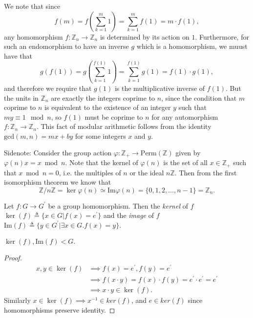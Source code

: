 \begin{Answer}
We note that since
$$
f(m) = f\left(\sum_{k=1}^m 1\right) = \sum_{k=1}^m f(1) = m \cdot f(1),
$$
any homomorphism $f : \mathbb{Z}_n \to \mathbb{Z}_n$ is determined by
its action on $1$. Furthermore, for such an endomorphism to have an
inverse $g$ which is a homomorphism, we muust have that
$$
g(f(1)) = g\left(\sum_{k=1}^{f(1)} 1\right)
        = \sum_{k=1}^{f(1)} g(1)
        = f(1) \cdot g(1),
$$
and therefore we require that $g(1)$ is the multiplicative inverse of
$f(1)$. But the units in $\mathbb{Z}_n$ are exactly the integers
coprime to $n$, since the condition that $m$ coprime to $n$ is
equivalent to the existence of an integer $y$ such that $my \equiv 1
\mod n$,
so $f(1)$ must be coprime to $n$ for any automorphism
$f : \mathbb{Z}_n \to \mathbb{Z}_n$. This fact of modular arithmetic
follows from the identity $\mathrm{gcd}(m, n) = mx + by$ for some
integers $x$ and $y$.

Sidenote: Consider the group action
$\varphi : \mathbb{Z}_+ \to \mathrm{Perm}(\mathbb{Z})$ given by
$\varphi(n) x = x \bmod n$. Note that the kernel of $\varphi(n)$
is the set of all $x \in \mathbb{Z}_+$ such that $x \bmod n = 0$,
i.e. the multiples of $n$ or the ideal $n \mathbb{Z}$. Then from the
first isomorphism theorem we know that
$$
\mathbb{Z} / n \mathbb{Z}
=      \ker \varphi(n)
\simeq \mathrm{Im} \varphi(n)
=      \{0, 1, 2, \dots, n-1\}
=      \mathbb{Z}_n.
$$
\end{Answer}

\begin{defn}
Let $f: G \to G^\prime$ be a group homomorphism. Then the \emph{kernel} of
$f$ $\ker(f) \triangleq \{ x \in G | f(x) = e^\prime \}$ and the \emph{image} of $f$
$\mathrm{Im}(f) \triangleq \{ y \in G^\prime | \exists x \in G . f(x) = y \}$.
\end{defn}

\begin{prop}
$\ker(f), \mathrm{Im}(f) < G$.
\end{prop}
\begin{proof}
\begin{align*}
  x, y \in \ker(f)
    & \implies f(x) = e^\prime, f(y) = e^\prime \\
    & \implies f(x \cdot y) = f(x) \cdot f(y)
                            = e^\prime \cdot e^\prime
                            = e^\prime          \\
    & \implies x \cdot y \in \ker(f).
\end{align*}
Similarly $x \in \ker(f) \implies x^{-1} \in ker(f)$,
and $e \in ker(f)$ since homomorphisms preserve identity.
\end{proof}

